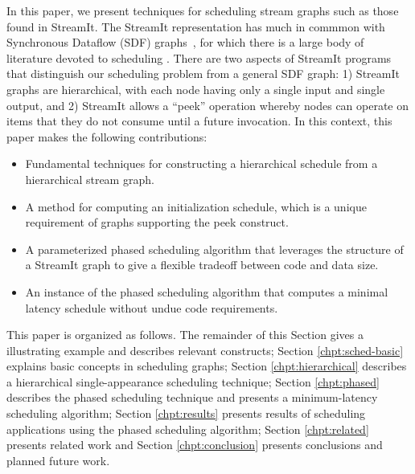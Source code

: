 In this paper, we present techniques for scheduling stream graphs such
as those found in StreamIt.  The StreamIt representation has much in
commmon with Synchronous Dataflow (SDF) graphs~\cite{lee87static}, for
which there is a large body of literature devoted to scheduling
.  There are two aspects of StreamIt programs that
distinguish our scheduling problem from a general SDF graph: 1)
StreamIt graphs are hierarchical, with each node having only a single
input and single output, and 2) StreamIt allows a ``peek'' operation
whereby nodes can operate on items that they do not consume until a
future invocation.  In this context, this paper makes the following
contributions:
\begin{itemize}
\item Fundamental techniques for constructing a hierarchical schedule
from a hierarchical stream graph.

\item A method for computing an initialization schedule, which is a
unique requirement of graphs supporting the peek construct.

\item A parameterized phased scheduling algorithm that leverages the
structure of a StreamIt graph to give a flexible tradeoff between code
and data size.

\item An instance of the phased scheduling algorithm that computes a
minimal latency schedule without undue code requirements.
\end{itemize}
This paper is organized as follows.  The remainder of this Section
gives a illustrating example and describes relevant {\StreamIt}
constructs; Section \ref{chpt:sched-basic} explains basic concepts in
scheduling {\StreamIt} graphs; Section \ref{chpt:hierarchical}
describes a hierarchical single-appearance scheduling technique;
Section \ref{chpt:phased} describes the phased scheduling technique
and presents a minimum-latency scheduling algorithm; Section
\ref{chpt:results} presents results of scheduling applications using
the phased scheduling algorithm; Section \ref{chpt:related} presents
related work and Section \ref{chpt:conclusion} presents conclusions
and planned future work.

